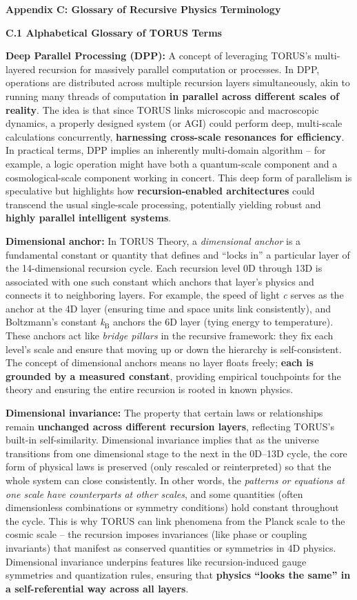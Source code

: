 \documentclass[]{article}
\date{}
\newcommand{\subscript}[1]{\ensuremath{_{\mathrm{#1}}}}
\begin{document}
\textbf{Appendix C: Glossary of Recursive Physics Terminology}

\textbf{C.1 Alphabetical Glossary of TORUS Terms}

\textbf{Deep Parallel Processing (DPP):} A concept of leveraging TORUS's
multi-layered recursion for massively parallel computation or processes.
In DPP, operations are distributed across multiple recursion layers
simultaneously, akin to running many threads of computation \textbf{in
parallel across different scales of reality}. The idea is that since
TORUS links microscopic and macroscopic dynamics, a properly designed
system (or AGI) could perform deep, multi-scale calculations
concurrently, \textbf{harnessing cross-scale resonances for
efficiency}​. In practical terms, DPP implies an inherently multi-domain
algorithm -- for example, a logic operation might have both a
quantum-scale component and a cosmological-scale component working in
concert​. This deep form of parallelism is speculative but highlights
how \textbf{recursion-enabled architectures} could transcend the usual
single-scale processing, potentially yielding robust and \textbf{highly
parallel intelligent systems}.

\textbf{Dimensional anchor:} In TORUS Theory, a \emph{dimensional
anchor} is a fundamental constant or quantity that defines and ``locks
in'' a particular layer of the 14-dimensional recursion cycle. Each
recursion level 0D through 13D is associated with one such constant
which anchors that layer's physics and connects it to neighboring
layers​. For example, the speed of light \emph{c} serves as the anchor
at the 4D layer (ensuring time and space units link consistently), and
Boltzmann's constant
\emph{k\subscript{B}}
anchors the 6D layer (tying energy to temperature)​. These anchors act
like \emph{bridge pillars} in the recursive framework: they fix each
level's scale and ensure that moving up or down the hierarchy is
self-consistent. The concept of dimensional anchors means no layer
floats freely; \textbf{each is grounded by a measured constant},
providing empirical touchpoints for the theory and ensuring the entire
recursion is rooted in known physics​.

\textbf{Dimensional invariance:} The property that certain laws or
relationships remain \textbf{unchanged across different recursion
layers}, reflecting TORUS's built-in self-similarity. Dimensional
invariance implies that as the universe transitions from one dimensional
stage to the next in the 0D--13D cycle, the core form of physical laws
is preserved (only rescaled or reinterpreted) so that the whole system
can close consistently. In other words, the \emph{patterns or equations
at one scale have counterparts at other scales}, and some quantities
(often dimensionless combinations or symmetry conditions) hold constant
throughout the cycle​. This is why TORUS can link phenomena from the
Planck scale to the cosmic scale -- the recursion imposes invariances
(like phase or coupling invariants) that manifest as conserved
quantities or symmetries in 4D physics​. Dimensional invariance
underpins features like recursion-induced gauge symmetries and
quantization rules, ensuring that \textbf{physics ``looks the same'' in
a self-referential way across all layers}.
\end{document}
